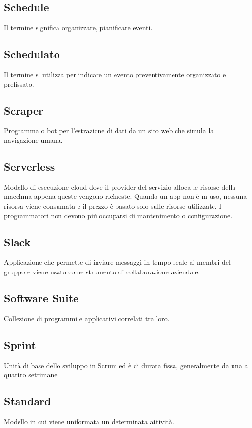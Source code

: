 \documentclass{classes/base}
\begin{document}
        \subsection*{Schedule} 
        Il termine significa organizzare, pianificare eventi.

        \subsection*{Schedulato}
        Il termine si utilizza per indicare un evento preventivamente organizzato e prefissato.
        
        \subsection*{Scraper}
        Programma o bot per l'estrazione di dati da un sito web che simula la navigazione umana.
        
        \subsection*{Serverless}
        Modello di esecuzione cloud dove il provider del servizio alloca le risorse della macchina appena queste vengono richieste. Quando un app non è in uso, nessuna risorsa viene consumata e il prezzo è basato solo sulle risorse utilizzate. I programmatori non devono più occuparsi di mantenimento o configurazione.

        \subsection*{Slack} 
        Applicazione che permette di inviare messaggi in tempo reale ai membri del gruppo e viene usato come strumento di collaborazione aziendale.

        \subsection*{Software Suite} 
        Collezione di programmi e applicativi correlati tra loro.
        
        \subsection*{Sprint}
        Unità di base dello sviluppo in Scrum ed è di durata fissa, generalmente da una a quattro settimane.

        \subsection*{Standard}
        Modello in cui viene uniformata un determinata attività.
\end{document}
